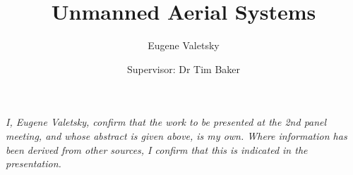 \documentclass[11pt]{article}
\title{\vspace{-2em}Unmanned Aerial Systems}
\author{Eugene Valetsky \and Supervisor: Dr Tim Baker}
\date{}
\begin{document}
\maketitle



\vspace{2em}
\small
\emph{I, Eugene Valetsky, confirm that the work to be presented at the 2nd panel meeting, and whose abstract is given above, is my own. Where information has been derived from other sources, I confirm that this is indicated in the presentation.}
\end{document}
